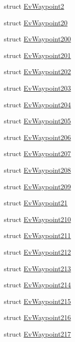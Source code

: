 \begin{DoxyCompactItemize}
\item 
struct \hyperlink{structmove__base__z__client_1_1EvWaypoint2}{Ev\+Waypoint2}
\item 
struct \hyperlink{structmove__base__z__client_1_1EvWaypoint20}{Ev\+Waypoint20}
\item 
struct \hyperlink{structmove__base__z__client_1_1EvWaypoint200}{Ev\+Waypoint200}
\item 
struct \hyperlink{structmove__base__z__client_1_1EvWaypoint201}{Ev\+Waypoint201}
\item 
struct \hyperlink{structmove__base__z__client_1_1EvWaypoint202}{Ev\+Waypoint202}
\item 
struct \hyperlink{structmove__base__z__client_1_1EvWaypoint203}{Ev\+Waypoint203}
\item 
struct \hyperlink{structmove__base__z__client_1_1EvWaypoint204}{Ev\+Waypoint204}
\item 
struct \hyperlink{structmove__base__z__client_1_1EvWaypoint205}{Ev\+Waypoint205}
\item 
struct \hyperlink{structmove__base__z__client_1_1EvWaypoint206}{Ev\+Waypoint206}
\item 
struct \hyperlink{structmove__base__z__client_1_1EvWaypoint207}{Ev\+Waypoint207}
\item 
struct \hyperlink{structmove__base__z__client_1_1EvWaypoint208}{Ev\+Waypoint208}
\item 
struct \hyperlink{structmove__base__z__client_1_1EvWaypoint209}{Ev\+Waypoint209}
\item 
struct \hyperlink{structmove__base__z__client_1_1EvWaypoint21}{Ev\+Waypoint21}
\item 
struct \hyperlink{structmove__base__z__client_1_1EvWaypoint210}{Ev\+Waypoint210}
\item 
struct \hyperlink{structmove__base__z__client_1_1EvWaypoint211}{Ev\+Waypoint211}
\item 
struct \hyperlink{structmove__base__z__client_1_1EvWaypoint212}{Ev\+Waypoint212}
\item 
struct \hyperlink{structmove__base__z__client_1_1EvWaypoint213}{Ev\+Waypoint213}
\item 
struct \hyperlink{structmove__base__z__client_1_1EvWaypoint214}{Ev\+Waypoint214}
\item 
struct \hyperlink{structmove__base__z__client_1_1EvWaypoint215}{Ev\+Waypoint215}
\item 
struct \hyperlink{structmove__base__z__client_1_1EvWaypoint216}{Ev\+Waypoint216}
\item 
struct \hyperlink{structmove__base__z__client_1_1EvWaypoint217}{Ev\+Waypoint217}

\end{DoxyCompactItemize}
